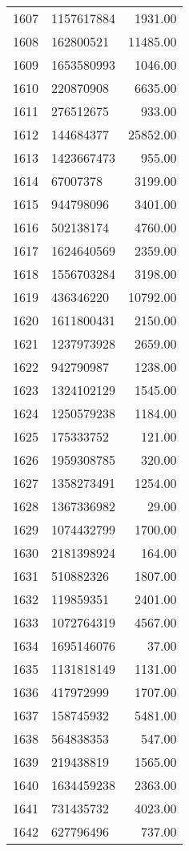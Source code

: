 \begin{table}[ht]
\begin{tabular}{rlr}
  1607 & 1157617884 & 1931.00 \\ 
  1608 & 162800521 & 11485.00 \\ 
  1609 & 1653580993 & 1046.00 \\ 
  1610 & 220870908 & 6635.00 \\ 
  1611 & 276512675 & 933.00 \\ 
  1612 & 144684377 & 25852.00 \\ 
  1613 & 1423667473 & 955.00 \\ 
  1614 & 67007378 & 3199.00 \\ 
  1615 & 944798096 & 3401.00 \\ 
  1616 & 502138174 & 4760.00 \\ 
  1617 & 1624640569 & 2359.00 \\ 
  1618 & 1556703284 & 3198.00 \\ 
  1619 & 436346220 & 10792.00 \\ 
  1620 & 1611800431 & 2150.00 \\ 
  1621 & 1237973928 & 2659.00 \\ 
  1622 & 942790987 & 1238.00 \\ 
  1623 & 1324102129 & 1545.00 \\ 
  1624 & 1250579238 & 1184.00 \\ 
  1625 & 175333752 & 121.00 \\ 
  1626 & 1959308785 & 320.00 \\ 
  1627 & 1358273491 & 1254.00 \\ 
  1628 & 1367336982 & 29.00 \\ 
  1629 & 1074432799 & 1700.00 \\ 
  1630 & 2181398924 & 164.00 \\ 
  1631 & 510882326 & 1807.00 \\ 
  1632 & 119859351 & 2401.00 \\ 
  1633 & 1072764319 & 4567.00 \\ 
  1634 & 1695146076 & 37.00 \\ 
  1635 & 1131818149 & 1131.00 \\ 
  1636 & 417972999 & 1707.00 \\ 
  1637 & 158745932 & 5481.00 \\ 
  1638 & 564838353 & 547.00 \\ 
  1639 & 219438819 & 1565.00 \\ 
  1640 & 1634459238 & 2363.00 \\ 
  1641 & 731435732 & 4023.00 \\ 
  1642 & 627796496 & 737.00 \\ 

\end{tabular}
\end{table}

